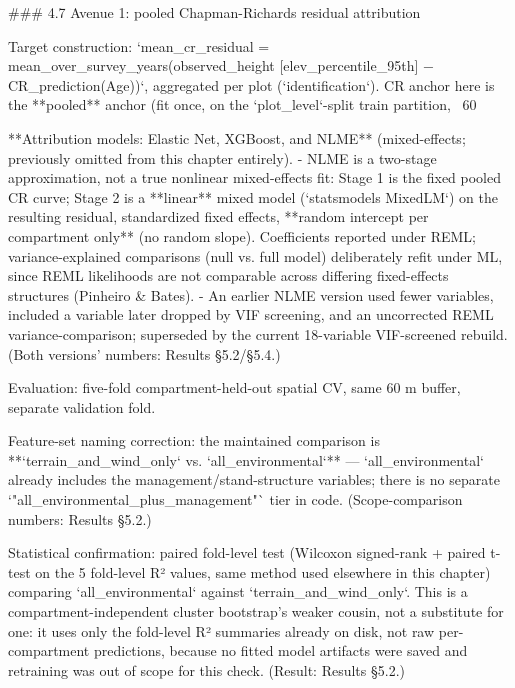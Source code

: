 ### 4.7 Avenue 1: pooled Chapman-Richards residual attribution

Target construction: `mean_cr_residual = mean_over_survey_years(observed_height [elev_percentile_95th] − CR_prediction(Age))`, aggregated per plot (`identification`). CR anchor here is the **pooled** anchor (fit once, on the `plot_level`-split train partition, ~60%

**Attribution models: Elastic Net, XGBoost, and NLME** (mixed-effects; previously omitted from this chapter entirely).
- NLME is a two-stage approximation, not a true nonlinear mixed-effects fit: Stage 1 is the fixed pooled CR curve; Stage 2 is a **linear** mixed model (`statsmodels MixedLM`) on the resulting residual, standardized fixed effects, **random intercept per compartment only** (no random slope). Coefficients reported under REML; variance-explained comparisons (null vs. full model) deliberately refit under ML, since REML likelihoods are not comparable across differing fixed-effects structures (Pinheiro & Bates).
- An earlier NLME version used fewer variables, included a variable later dropped by VIF screening, and an uncorrected REML variance-comparison; superseded by the current 18-variable VIF-screened rebuild. (Both versions' numbers: Results §5.2/§5.4.)

Evaluation: five-fold compartment-held-out spatial CV, same 60 m buffer, separate validation fold.

Feature-set naming correction: the maintained comparison is **`terrain_and_wind_only` vs. `all_environmental`** — `all_environmental` already includes the management/stand-structure variables; there is no separate `"all_environmental_plus_management"` tier in code. (Scope-comparison numbers: Results §5.2.)

Statistical confirmation: paired fold-level test (Wilcoxon signed-rank + paired t-test on the 5 fold-level R² values, same method used elsewhere in this chapter) comparing `all_environmental` against `terrain_and_wind_only`. This is a compartment-independent cluster bootstrap's weaker cousin, not a substitute for one: it uses only the fold-level R² summaries already on disk, not raw per-compartment predictions, because no fitted model artifacts were saved and retraining was out of scope for this check. (Result: Results §5.2.)


